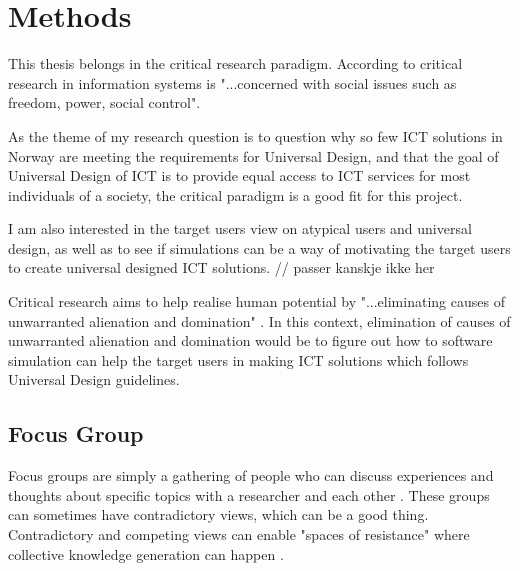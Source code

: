 \chapter{Methods}



This thesis belongs in the critical research paradigm. According to \textcite{myers_set_2011} critical research in information systems is "...concerned with social issues such as freedom, power, social control". 

As the theme of my research question is to question why so few ICT solutions in Norway are meeting the requirements for Universal Design, and that the goal of Universal Design of ICT is to provide equal access to ICT services for most individuals of a society, the critical paradigm is a good fit for this project. 

I am also interested in the target users view on atypical users and universal design, as well as to see if simulations can be a way of motivating the target users to create universal designed ICT solutions. // passer kanskje ikke her

Critical research aims to help realise human potential by "...eliminating causes of unwarranted alienation and domination" \textcite{myers_set_2011}. In this context, elimination of causes of unwarranted alienation and domination would be to figure out how to software simulation can help the target users in making ICT solutions which follows Universal Design guidelines. 






%

\section{Focus Group}
Focus groups are simply a gathering of people who can discuss experiences and thoughts about specific topics with a researcher and each other \textcite[90]{CrangMike2007De}. These groups can sometimes have contradictory views, which can be a good thing. Contradictory and competing views can enable "spaces of resistance" where collective knowledge generation can happen \parencite[90]{CrangMike2007De}. 

